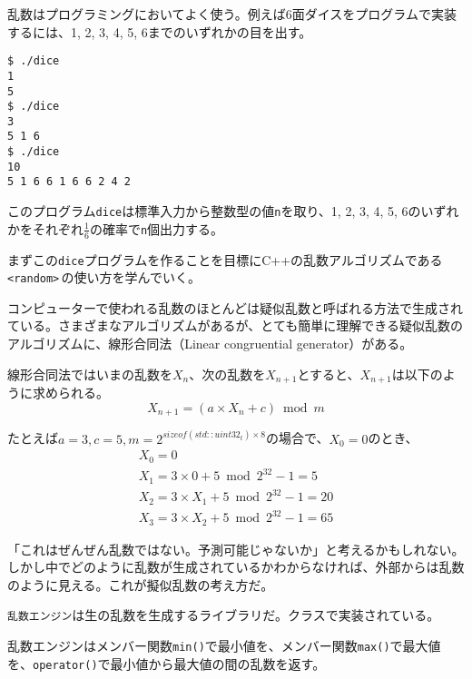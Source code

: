
乱数はプログラミングにおいてよく使う。例えば6面ダイスをプログラムで実装するには、1, 2, 3, 4, 5, 6までのいずれかの目を出す。

\begin{lstlisting}[style=terminal]
$ ./dice
1
5
$ ./dice
3
5 1 6
$ ./dice
10
5 1 6 6 1 6 6 2 4 2
\end{lstlisting}

このプログラム\texttt{dice}は標準入力から整数型の値\texttt{n}を取り、1, 2, 3, 4, 5, 6のいずれかをそれぞれ\(\frac{1}{6}\)の確率で\texttt{n}個出力する。

まずこの\texttt{dice}プログラムを作ることを目標にC++の乱数アルゴリズムである\,\texttt{<random>}\,の使い方を学んでいく。


コンピューターで使われる乱数のほとんどは疑似乱数と呼ばれる方法で生成されている。さまざまなアルゴリズムがあるが、とても簡単に理解できる疑似乱数のアルゴリズムに、線形合同法（Linear congruential generator）がある。

\ifTombow\pagebreak\fi
線形合同法ではいまの乱数を\(X_n\)、次の乱数を\(X_{n+1}\)とすると、\(X_{n+1}\)は以下のように求められる。
\[
X_{n+1} = (a \times X_{n} + c) \bmod m
\]

たとえば\(a = 3, c = 5, m = 2^{sizeof(std::uint32_t) \times 8}\)の場合で、\(X_0 = 0\)のとき、
\begin{gather*}
X_0 = 0 \\
X_1 = 3 \times 0 + 5 \bmod 2^{32}-1 = 5 \\
X_2 = 3 \times X_1 + 5 \bmod 2^{32}-1 = 20 \\
X_3 = 3 \times X_2 + 5 \bmod 2^{32}-1 = 65
\end{gather*}

「これはぜんぜん乱数ではない。予測可能じゃないか」と考えるかもしれない。しかし中でどのように乱数が生成されているかわからなければ、外部からは乱数のように見える。これが擬似乱数の考え方だ。


\texttt{乱数エンジン}は生の乱数を生成するライブラリだ。クラスで実装されている。

乱数エンジンはメンバー関数\texttt{min()}で最小値を、メンバー関数\texttt{max()}で最大値を、\texttt{operator()}で最小値から最大値の間の乱数を返す。

